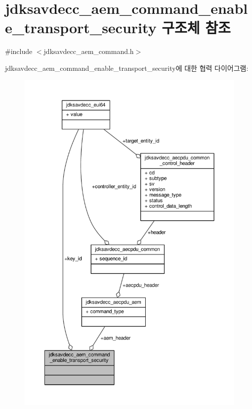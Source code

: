 \hypertarget{structjdksavdecc__aem__command__enable__transport__security}{}\section{jdksavdecc\+\_\+aem\+\_\+command\+\_\+enable\+\_\+transport\+\_\+security 구조체 참조}
\label{structjdksavdecc__aem__command__enable__transport__security}


{\ttfamily \#include $<$jdksavdecc\+\_\+aem\+\_\+command.\+h$>$}



jdksavdecc\+\_\+aem\+\_\+command\+\_\+enable\+\_\+transport\+\_\+security에 대한 협력 다이어그램\+:
\nopagebreak
\begin{figure}[H]
\begin{center}
\leavevmode
\includegraphics[width=350pt]{structjdksavdecc__aem__command__enable__transport__security__coll__graph}
\end{center}
\end{figure}
